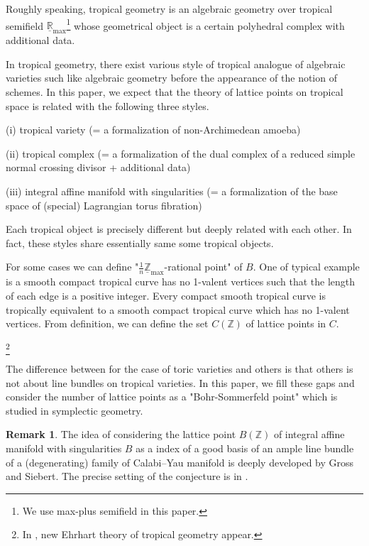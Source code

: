 \documentclass[a4paper,dvipdfmx,reqno,12pt]{amsart}
\theoremstyle{definition}
\newtheorem{Rmk}[Thm]{Remark}
\newcommand{\Z}{\mathbb{Z}}%
\newcommand{\mb}[1]{\mathbb{#1}}%
\numberwithin{equation}{section}
\begin{document}
Roughly speaking, tropical geometry is an algebraic geometry over tropical semifield  $\underline{\mb{R}}_{\max}$\footnote{We use max-plus semifield in this paper.} whose geometrical object is a certain polyhedral complex with additional data.

In tropical geometry, there exist various style of tropical analogue of algebraic varieties such like algebraic geometry before the appearance of the notion of schemes. In this paper, we expect that the theory of lattice points on tropical space is related with the following three styles.

(i) tropical variety (= a formalization of non-Archimedean amoeba)

(ii) tropical complex (= a formalization of the dual complex of a reduced simple normal crossing divisor + additional data)

(iii) integral affine manifold with singularities (= a formalization of the base space of (special) Lagrangian torus fibration)

Each tropical object is precisely different but deeply related with each other. In fact, these styles share essentially same some tropical objects.

For some cases we can define "$\frac{1}{n}\underline{\Z}_{\max}$-rational point" of $B$.
One of typical example is a smooth compact tropical curve has no 1-valent vertices such that the length of each edge is a positive integer.
Every compact smooth tropical curve is tropically equivalent \cite[Definition 3.5]{mikhalkinTropicalCurvesTheir2008a} to a smooth compact tropical curve which has no 1-valent vertices. From definition, we can define the set $C(\Z)$ of lattice points in $C$.

\footnote{In \cite{MR4155409}, new Ehrhart theory of tropical geometry appear.}



The difference between for the case of toric varieties and others is that others is not about line bundles on tropical varieties. In this  paper, we fill these gaps and consider the number of lattice points as a "Bohr-Sommerfeld point" which is studied in symplectic geometry.

\begin{Rmk}
  The idea of considering the lattice point $B(\Z)$ of integral affine manifold with singularities $B$ as a index of a good basis of an ample line bundle of a (degenerating) family of Calabi--Yau manifold is deeply developed by Gross and Siebert. The precise setting of the conjecture is in \cite[Conjecture 1.6]{MR3525095}.

\end{Rmk}
\end{document}
